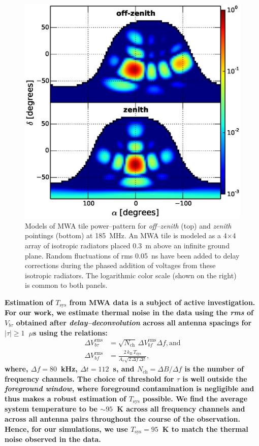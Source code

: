 \documentclass[preprint2,iop,numberedappendix]{emulateapj}
\begin{document}
\begin{figure}[htb]
\centering
\includegraphics[width=\linewidth]{f4.eps}
\caption{Models of MWA tile power--pattern for {\it off--zenith} (top) and {\it zenith} pointings (bottom) at 185~MHz. An MWA tile is modeled as a 4$\times$4 array of isotropic radiators placed 0.3~m above an infinite ground plane. Random fluctuations of rms 0.05~ns have been added to delay corrections during the phased addition of voltages from these isotropic radiators. The logarithmic color scale (shown on the right) is common to both panels. \label{fig:power_pattern}}
\end{figure}

{\bf Estimation of $T_\textrm{sys}$ from MWA data is a subject of active investigation. For our work, we estimate thermal noise in the data using the {\it rms} of $V_{b\tau}$ obtained after {\it delay--deconvolution} across all antenna spacings for $|\tau| \geq 1$~$\mu$s using the relations:
\begin{align}\label{eqn:Tsys}
  \Delta V_{b\tau}^\textrm{rms} &= \sqrt{N_\textrm{ch}}\,\Delta V_{bf}^\textrm{rms} \Delta f, \textrm{and} \\
  \Delta V_{bf}^\textrm{rms} &= \frac{2\,k_\textrm{B}\,T_\textrm{sys}}{A_\textrm{e}\sqrt{2\,\Delta f\,\Delta t}},
\end{align}
where, $\Delta f = 80$~kHz, $\Delta t = 112$~s, and $N_\textrm{ch}=\Delta B/\Delta f$ is the number of frequency channels. The choice of threshold for $\tau$ is well outside the {\it foreground window}, where foreground contamination is negligible and thus makes a robust estimation of $T_\textrm{sys}$ possible. We find the average system temperature to be $\sim 95$~K across all frequency channels and across all antenna pairs throughout the course of the observation. Hence, for our simulations, we use $T_\textrm{sys}=95$~K to match the thermal noise observed in the data.} 
\end{document}
